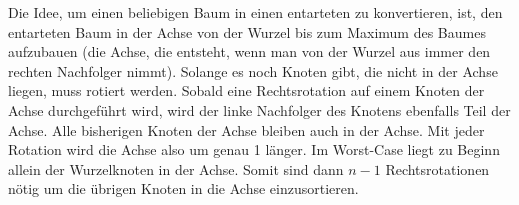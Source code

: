 \documentclass[11pt,a4paper]{article}
\begin{document}
\begin{loesung}
\begin{enumerate}
        Die Idee, um einen beliebigen Baum in einen entarteten zu konvertieren, ist, den entarteten Baum in der Achse von der Wurzel bis zum Maximum des Baumes aufzubauen (die Achse, die entsteht, wenn man von der Wurzel aus immer den rechten Nachfolger nimmt).
        Solange es noch Knoten gibt, die nicht in der Achse liegen, muss rotiert werden.
        Sobald eine Rechtsrotation auf einem Knoten der Achse durchgeführt wird, wird der linke Nachfolger des Knotens ebenfalls Teil der Achse.
        Alle bisherigen Knoten der Achse bleiben auch in der Achse.
        Mit jeder Rotation wird die Achse also um genau 1 länger.
        Im Worst-Case liegt zu Beginn allein der Wurzelknoten in der Achse.
        Somit sind dann $n - 1$ Rechtsrotationen nötig um die übrigen Knoten in die Achse einzusortieren.
    \end{enumerate}
\end{loesung}
\end{document}
